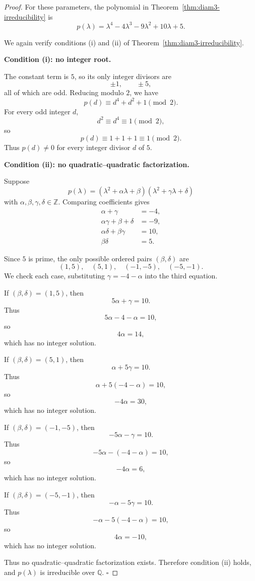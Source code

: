 \documentclass[11pt]{amsart}
\begin{document}
\begin{proof}
For these parameters, the polynomial in Theorem~\ref{thm:diam3-irreducibility} is
\[
p(\lambda)
=
\lambda^4-4\lambda^3-9\lambda^2+10\lambda+5.
\]

We again verify conditions \textup{(i)} and \textup{(ii)} of
Theorem~\ref{thm:diam3-irreducibility}.

\medskip
\noindent\textbf{Condition \textup{(i): no integer root.}}

The constant term is \(5\), so its only integer divisors are
\[
\pm 1,\qquad \pm 5,
\]
all of which are odd. Reducing modulo \(2\), we have
\[
p(d)\equiv d^4+d^2+1\pmod{2}.
\]
For every odd integer \(d\),
\[
d^2\equiv d^4\equiv 1\pmod{2},
\]
so
\[
p(d)\equiv 1+1+1\equiv 1\pmod{2}.
\]
Thus \(p(d)\neq 0\) for every integer divisor \(d\) of \(5\).

\medskip
\noindent\textbf{Condition \textup{(ii): no quadratic--quadratic factorization.}}

Suppose
\[
p(\lambda)
=
(\lambda^2+\alpha\lambda+\beta)
(\lambda^2+\gamma\lambda+\delta)
\]
with \(\alpha,\beta,\gamma,\delta\in\mathbb Z\). Comparing coefficients gives
\[
\begin{aligned}
\alpha+\gamma&=-4,\\
\alpha\gamma+\beta+\delta&=-9,\\
\alpha\delta+\beta\gamma&=10,\\
\beta\delta&=5.
\end{aligned}
\]

Since \(5\) is prime, the only possible ordered pairs \((\beta,\delta)\) are
\[
(1,5),\quad (5,1),\quad (-1,-5),\quad (-5,-1).
\]
We check each case, substituting \(\gamma=-4-\alpha\) into the third
equation.

If \((\beta,\delta)=(1,5)\), then
\[
5\alpha+\gamma=10.
\]
Thus
\[
5\alpha-4-\alpha=10,
\]
so
\[
4\alpha=14,
\]
which has no integer solution.

If \((\beta,\delta)=(5,1)\), then
\[
\alpha+5\gamma=10.
\]
Thus
\[
\alpha+5(-4-\alpha)=10,
\]
so
\[
-4\alpha=30,
\]
which has no integer solution.

If \((\beta,\delta)=(-1,-5)\), then
\[
-5\alpha-\gamma=10.
\]
Thus
\[
-5\alpha-(-4-\alpha)=10,
\]
so
\[
-4\alpha=6,
\]
which has no integer solution.

If \((\beta,\delta)=(-5,-1)\), then
\[
-\alpha-5\gamma=10.
\]
Thus
\[
-\alpha-5(-4-\alpha)=10,
\]
so
\[
4\alpha=-10,
\]
which has no integer solution.

Thus no quadratic--quadratic factorization exists. Therefore condition \textup{(ii)} holds, and \(p(\lambda)\) is irreducible over \(\mathbb Q\). \hfill $\square$
\end{proof}
\end{document}
